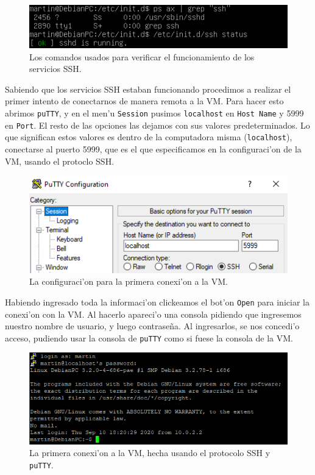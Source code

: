 \documentclass[11pt]{article}
\begin{document}
		\begin{figure}[H]
    			\centering
    			\includegraphics[scale=0.8]{Images/Config/SSH_check.PNG}
    			\caption{Los comandos usados para verificar el funcionamiento de los servicios SSH.}
    			\label{fig:SSH_check}
		\end{figure}
		
		Sabiendo que los servicios SSH estaban funcionando procedimos a realizar el primer intento de conectarnos de manera remota a la VM. Para hacer esto abrimos \texttt{puTTY}, y en el men'u \texttt{Session} pusimos \texttt{localhost} en \texttt{Host Name} y 5999 en \texttt{Port}. El resto de las opciones las dejamos con sus valores predeterminados. Lo que significan estos valores es dentro de la computadora misma (\texttt{localhost}), conectarse al puerto 5999, que es el que especificamos en la configuraci'on de la VM, usando el protoclo SSH.
		
		\begin{figure}[H]
    			\centering
    			\includegraphics[scale=0.9]{Images/Connection/first_connection_attempt.PNG}
    			\caption{La configuraci'on para la primera conexi'on a la VM.}
    			\label{fig:first_connection_attempt}
		\end{figure}
		
		Habiendo ingresado toda la informaci'on clickeamos el bot'on \texttt{Open} para iniciar la conexi'on con la VM. Al hacerlo apareci'o una consola pidiendo que ingresemos nuestro nombre de usuario, y luego contraseña. Al ingresarlos, se nos concedi'o acceso, pudiendo usar la consola de \texttt{puTTY} como si fuese la consola de la VM. 
		
		\begin{figure}[H]
    			\centering
    			\captionsetup{justification=centering}
    			\includegraphics[width=0.9\linewidth]{Images/Connection/first_connection_console.PNG}
    			\caption{La primera conexi'on a la VM, hecha usando el protocolo SSH y \texttt{puTTY}.}
    			\label{fig:first_connection_console}
		\end{figure}
		
\end{document}
